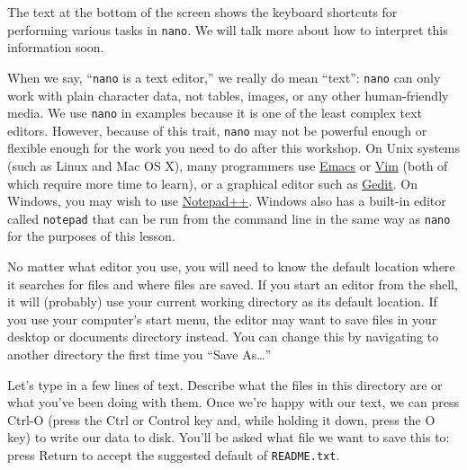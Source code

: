 \documentclass[
  letterpaper,
  DIV=11,
  numbers=noendperiod]{scrreprt}
\begin{document}
The text at the bottom of the screen shows the keyboard shortcuts for
performing various tasks in \texttt{nano}. We will talk more about how
to interpret this information soon.

\begin{tcolorbox}[enhanced jigsaw, opacitybacktitle=0.6, colback=white, coltitle=black, opacityback=0, rightrule=.15mm, toptitle=1mm, toprule=.15mm, bottomtitle=1mm, colframe=quarto-callout-note-color-frame, arc=.35mm, titlerule=0mm, colbacktitle=quarto-callout-note-color!10!white, leftrule=.75mm, title=\textcolor{quarto-callout-note-color}{\faInfo}\hspace{0.5em}{Which Editor?}, breakable, bottomrule=.15mm, left=2mm]

When we say, ``\texttt{nano} is a text editor,'' we really do mean
``text'': \texttt{nano} can only work with plain character data, not
tables, images, or any other human-friendly media. We use \texttt{nano}
in examples because it is one of the least complex text editors.
However, because of this trait, \texttt{nano} may not be powerful enough
or flexible enough for the work you need to do after this workshop. On
Unix systems (such as Linux and Mac OS X), many programmers use
\href{http://www.gnu.org/software/emacs/}{Emacs} or
\href{http://www.vim.org/}{Vim} (both of which require more time to
learn), or a graphical editor such as
\href{http://projects.gnome.org/gedit/}{Gedit}. On Windows, you may wish
to use \href{http://notepad-plus-plus.org/}{Notepad++}. Windows also has
a built-in editor called \texttt{notepad} that can be run from the
command line in the same way as \texttt{nano} for the purposes of this
lesson.

No matter what editor you use, you will need to know the default
location where it searches for files and where files are saved. If you
start an editor from the shell, it will (probably) use your current
working directory as its default location. If you use your computer's
start menu, the editor may want to save files in your desktop or
documents directory instead. You can change this by navigating to
another directory the first time you ``Save As\ldots{}''

\end{tcolorbox}

Let's type in a few lines of text. Describe what the files in this
directory are or what you've been doing with them. Once we're happy with
our text, we can press Ctrl-O (press the Ctrl or Control key and, while
holding it down, press the O key) to write our data to disk. You'll be
asked what file we want to save this to: press Return to accept the
suggested default of \texttt{README.txt}.
\end{document}
